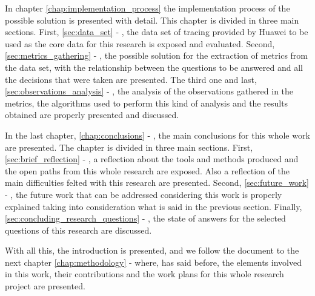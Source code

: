 In chapter \ref{chap:implementation_process} the implementation process of the possible solution is presented with detail. This chapter is divided in three main sections. First, \ref{sec:data_set} - , the data set of tracing provided by Huawei to be used as the core data for this research is exposed and evaluated. Second, \ref{sec:metrics_gathering} - , the possible solution for the extraction of metrics from the data set, with the relationship between the questions to be answered and all the decisions that were taken are presented. The third one and last, \ref{sec:observations_analysis} - , the analysis of the observations gathered in the metrics, the algorithms used to perform this kind of analysis and the results obtained are properly presented and discussed.

In the last chapter, \ref{chap:conclusions} - , the main conclusions for this whole work are presented. The chapter is divided in three main sections. First, \ref{sec:brief_reflection} - , a reflection about the tools and methods produced and the open paths from this whole research are exposed. Also a reflection of the main difficulties felted with this research are presented. Second, \ref{sec:future_work} - , the future work that can be addressed considering this work is properly explained taking into consideration what is said in the previous section. Finally, \ref{sec:concluding_research_questions} - , the state of answers for the selected questions of this research are discussed.

With all this, the introduction is presented, and we follow the document to the next chapter \ref{chap:methodology} -  where, has said before, the elements involved in this work, their contributions and the work plans for this whole research project are presented.


\checkoddpage
{}
{ %
\newpage
\blankpage}
{ %
}